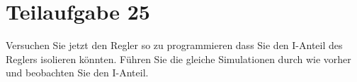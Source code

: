 \section{Teilaufgabe 25}
\begin{aufgabe}
Versuchen Sie jetzt den Regler so zu programmieren dass Sie den I-Anteil des 
Reglers isolieren könnten. Führen Sie die gleiche Simulationen durch wie 
vorher und beobachten Sie den I-Anteil.
\end{aufgabe}

